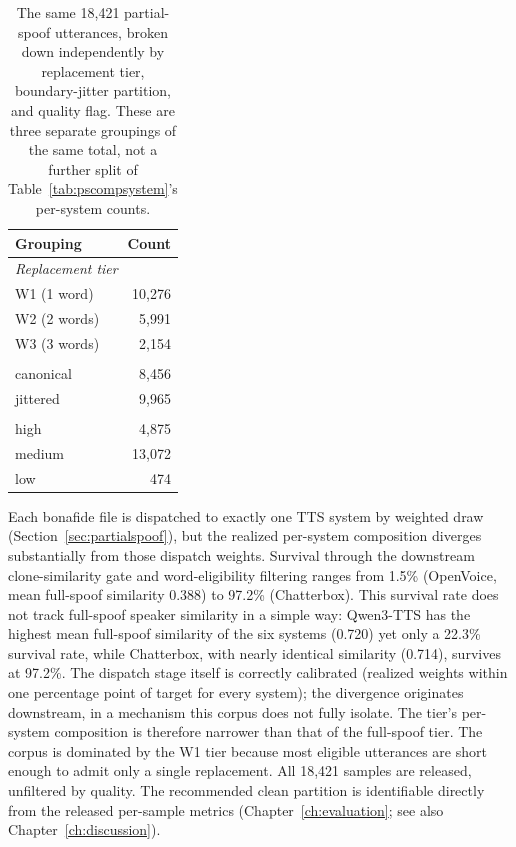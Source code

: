 \documentclass[11pt]{report}
\begin{document}
\begin{table}[H]
\centering
\caption{The same 18{,}421 partial-spoof utterances, broken down
independently by replacement tier, boundary-jitter partition, and
quality flag. These are three separate groupings of the same total,
not a further split of Table~\ref{tab:pscompsystem}'s per-system
counts.}
\label{tab:pscompbreakdown}
\small
\begin{tabular}{lr}
\toprule
\textbf{Grouping} & \textbf{Count} \\
\midrule
\multicolumn{2}{l}{\emph{Replacement tier}} \\
\quad W1 (1 word)  & 10{,}276 \\
\quad W2 (2 words) &  5{,}991 \\
\quad W3 (3 words) &  2{,}154 \\
\addlinespace
\multicolumn{2}{l}{\emph{Boundary-jitter partition}} \\
\quad canonical  &  8{,}456 \\
\quad jittered   &  9{,}965 \\
\addlinespace
\multicolumn{2}{l}{\emph{Quality flag}} \\
\quad high   &  4{,}875 \\
\quad medium & 13{,}072 \\
\quad low    &    474 \\
\bottomrule
\end{tabular}
\end{table}

Each bonafide file is dispatched to exactly one TTS system by weighted
draw (Section~\ref{sec:partialspoof}), but the realized per-system
composition diverges substantially from those dispatch weights.
Survival through the downstream clone-similarity gate and
word-eligibility filtering ranges from 1.5\% (OpenVoice, mean
full-spoof similarity 0.388) to 97.2\% (Chatterbox). This survival rate
does not track full-spoof speaker similarity in a simple way:
Qwen3-TTS has the highest mean full-spoof similarity of the six
systems (0.720) yet only a 22.3\% survival rate, while Chatterbox,
with nearly identical similarity (0.714), survives at 97.2\%. The
dispatch stage itself is correctly calibrated (realized weights within
one percentage point of target for every system); the divergence
originates downstream, in a mechanism this corpus does not fully
isolate. The tier's per-system composition is therefore narrower than
that of the full-spoof tier. The
corpus is dominated by the W1 tier because most eligible utterances are
short enough to admit only a single replacement. All 18{,}421 samples are
released, unfiltered by quality. The recommended clean partition is
identifiable directly from the released per-sample metrics
(Chapter~\ref{ch:evaluation}; see also Chapter~\ref{ch:discussion}).
\end{document}

